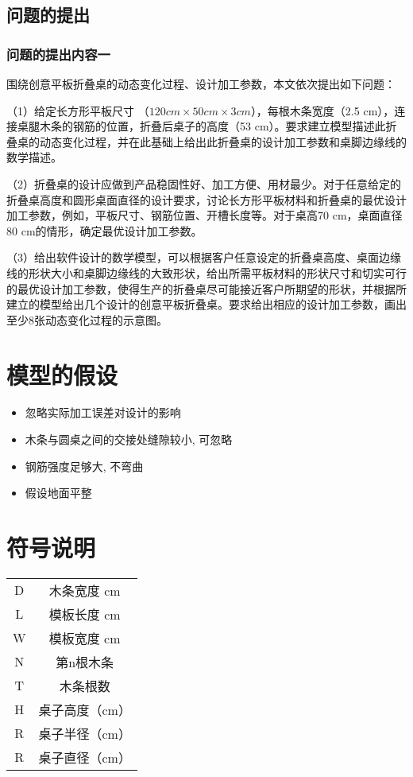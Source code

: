 \documentclass[bwprint]{gmcmthesis}
\begin{document}
		\subsection{问题的提出}
		
		\subsubsection{问题的提出内容一}
		围绕创意平板折叠桌的动态变化过程、设计加工参数，本文依次提出如下问题：
		
		（1）给定长方形平板尺寸 （$120 cm \times 50 cm \times 3 cm$），每根木条宽度（2.5 cm），连接桌腿木条的钢筋的位置，折叠后桌子的高度（53 cm）。要求建立模型描述此折叠桌的动态变化过程，并在此基础上给出此折叠桌的设计加工参数和桌脚边缘线的数学描述。
		
		
		
		（2）折叠桌的设计应做到产品稳固性好、加工方便、用材最少。对于任意给定的折叠桌高度和圆形桌面直径的设计要求，讨论长方形平板材料和折叠桌的最优设计加工参数，例如，平板尺寸、钢筋位置、开槽长度等。对于桌高70 cm，桌面直径80 cm的情形，确定最优设计加工参数。
		
		
		（3）给出软件设计的数学模型，可以根据客户任意设定的折叠桌高度、桌面边缘线的形状大小和桌脚边缘线的大致形状，给出所需平板材料的形状尺寸和切实可行的最优设计加工参数，使得生产的折叠桌尽可能接近客户所期望的形状，并根据所建立的模型给出几个设计的创意平板折叠桌\cite{beeton_unicode_2008}。要求给出相应的设计加工参数，画出至少8张动态变化过程的示意图。
		
	\section{模型的假设}
		
		\begin{itemize}
			\item 忽略实际加工误差对设计的影响
			\item 木条与圆桌之间的交接处缝隙较小, 可忽略
			\item 钢筋强度足够大, 不弯曲
			\item 假设地面平整
		\end{itemize}
	
	\section{符号说明}
		
		\begin{tabular}{cc}
			\hline
			\makebox[0.4\textwidth][c]{符号} & \makebox[0.5\textwidth][c]{意义} \\ \hline
			D & 木条宽度 {cm} \\ \hline
			L & 模板长度 {cm} \\ \hline
			W & 模板宽度 cm \\ \hline
			N & 第n根木条  \\ \hline
			T & 木条根数  \\ \hline
			H & 桌子高度（cm）  \\ \hline
			R & 桌子半径（cm）  \\ \hline
			R & 桌子直径（cm）  \\ \hline
		\end{tabular}
	
\end{document}
